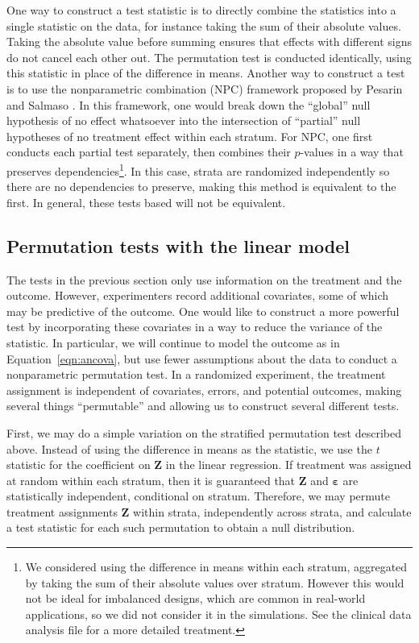 \documentclass[11pt]{article}
\begin{document}
One way to construct a test statistic is to directly combine the statistics into a single statistic on the data, for instance taking the sum of their absolute values.
Taking the absolute value before summing ensures that effects with different signs do not cancel each other out.
The permutation test is conducted identically, using this statistic in place of the difference in means.
Another way to construct a test is to use the nonparametric combination (NPC) framework proposed by Pesarin and Salmaso \cite{pesarin_permutation_2010}.
In this framework, one would break down the ``global'' null hypothesis of no effect whatsoever into the intersection of ``partial'' null hypotheses of no treatment effect within each stratum.
For NPC, one first conducts each partial test separately, then combines their $p$-values in a way that preserves dependencies\footnote{ 
We considered using the difference in means within each stratum, aggregated by taking the sum of their absolute values over stratum. However this would not be ideal for imbalanced designs, which are common in real-world applications, so we did not consider it in the simulations.  See the clinical data analysis file for a more detailed treatment.}.
In this case, strata are randomized independently so there are no dependencies to preserve, making this method is equivalent to the first.
In general, these tests based will not be equivalent.

\subsection*{Permutation tests with the linear model}
The tests in the previous section only use information on the treatment and the outcome.
However, experimenters record additional covariates, some of which may be predictive of the outcome.
One would like to construct a more powerful test by incorporating these covariates in a way to reduce the variance of the statistic.
In particular, we will continue to model the outcome as in Equation~\ref{eqn:ancova}, but use fewer assumptions about the data to conduct a nonparametric permutation test.
In a randomized experiment, the treatment assignment is independent of covariates, errors, and potential outcomes,
making several things ``permutable'' and allowing us to construct several different tests.

First, we may do a simple variation on the stratified permutation test described above.
Instead of using the difference in means as the statistic, we use the $t$ statistic for the coefficient on $\mathbf{Z}$ in the linear regression.
If treatment was assigned at random within each stratum, then it is guaranteed that $\mathbf{Z}$ and $\mathbf{\varepsilon}$ are statistically independent, conditional on stratum.
Therefore, we may permute treatment assignments $\mathbf{Z}$ within strata, independently across strata, and calculate a test statistic for each such permutation to obtain a null distribution.
\end{document}
